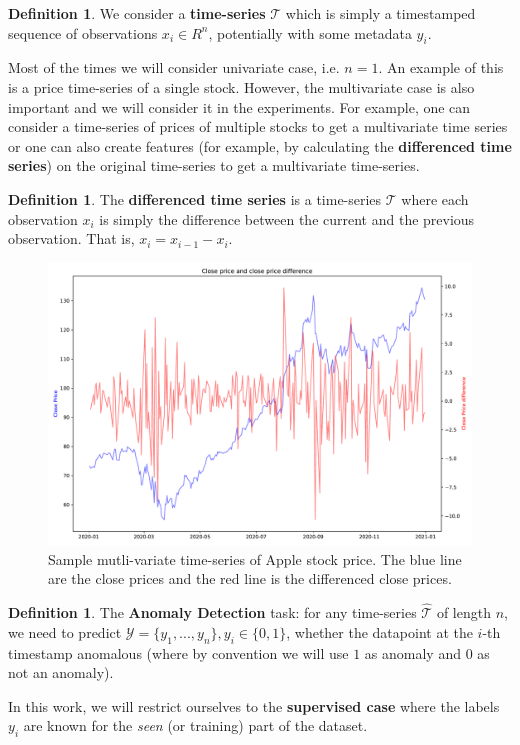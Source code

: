 \documentclass[a4paper, twoside]{report}
\theoremstyle{definition}
\newtheorem{definition}[theorem]{Definition}
\numberwithin{equation}{section}
\begin{document}
\begin{definition}
    We consider a \textbf{time-series} $\mathcal{T}$ which is simply a timestamped sequence of observations $x_i \in R^n$,
    potentially with some metadata $y_i$.
\end{definition}

Most of the times we will consider univariate case, i.e. $n=1$.
An example of this is a price time-series of a single stock.
However, the multivariate case is also important and we will consider it in the experiments.
For example, one can consider a time-series of prices of multiple stocks to get a multivariate time series or
one can also create features (for example, by calculating the \textbf{differenced time series})
on the original time-series to get a multivariate time-series.

\begin{definition}
    The \textbf{differenced time series} is a time-series $\mathcal{T}$ where each observation $x_i$ is simply the difference
    between the current and the previous observation.
    That is, $x_i=x_{i-1}-x_i$.
\end{definition}

\begin{figure}[h!]
    \centering
    \includegraphics[width=\textwidth]{etc/apple_time_series.pdf}
    \caption{Sample mutli-variate time-series of Apple stock price. The blue line are the close prices
        and the red line is the differenced close prices.}
    \label{fig:apple_time_series}
\end{figure}


\begin{definition}
    The \textbf{Anomaly Detection} task:
    for any time-series $\hat{\mathcal{T}}$ of length $n$, we need to predict $\mathcal{Y} = \{y_1, . . . , y_n \}, y_i \in \{0, 1\}$,
    whether the datapoint at the $i$-th timestamp anomalous (where by convention we will use $1$ as anomaly and $0$ as not an anomaly).
\end{definition}
In this work, we will restrict ourselves to the \textbf{supervised case}
where the labels $y_i$ are known for the \emph{seen} (or training) part of the dataset.
\end{document}
